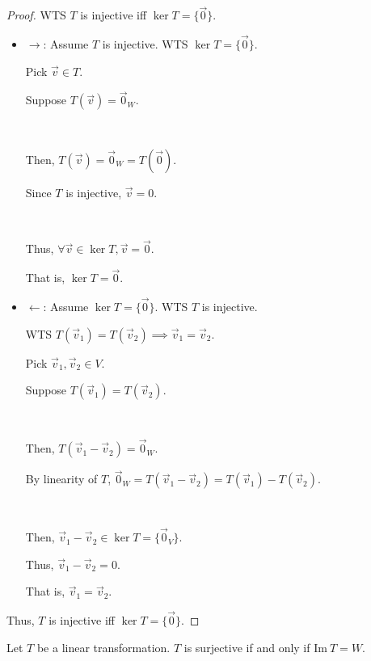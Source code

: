 \documentclass[11pt,fleqn]{book} %
\begin{document}
\begin{proof}
    WTS $T$ is injective iff $\ker T = \{\vec{0} \}$.

    \begin{itemize}
        \item $\rightarrow$: Assume $T$ is injective. WTS $\ker T = \{\vec{0} \}$.

        Pick $\vec{v} \in T$.

        Suppose $T(\vec{v})=\vec{0}_W$.

        {~~~}

        Then, $T(\vec{v}) = \vec{0}_W = T(\vec{0})$.

        Since $T$ is injective, $\vec{v} = 0$.

        {~~~}

        Thus, $\forall \vec{v} \in \ker T, \vec{v} = \vec{0}$.

        That is, $\ker T=\vec{0}$.

        \item $\leftarrow$: Assume $\ker T = \{\vec{0} \}$. WTS $T$ is injective.

        WTS $T(\vec{v}_1) = T(\vec{v}_2) \implies \vec{v}_1 = \vec{v}_2$.

        Pick $\vec{v}_1, \vec{v}_2 \in V$.

        Suppose $T(\vec{v}_1)=T(\vec{v}_2)$.

        {~~~}

        Then, $T(\vec{v}_1 - \vec{v}_2) = \vec{0}_W$.

        By linearity of $T$, $\vec{0}_W = T(\vec{v}_1 - \vec{v}_2) = T(\vec{v}_1) - T(\vec{v}_2)$.

        {~~~}

        Then, $\vec{v}_1 - \vec{v}_2 \in \ker T = \{ \vec{0}_V \}$.

        Thus, $\vec{v}_1 - \vec{v}_2 = 0$.

        That is, $\vec{v}_1 = \vec{v}_2$.
    \end{itemize}

    Thus, $T$ is injective iff $\ker T = \{\vec{0} \}$.
\end{proof}

\begin{proposition}
    Let $T$ be a linear transformation. $T$ is surjective if and only if $\mathrm{Im}~T=W$.
\end{proposition}
\setcounter{section}{2}
\end{document}
